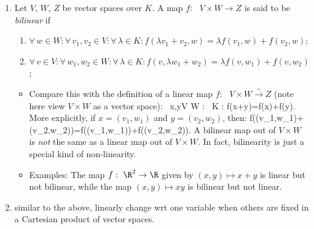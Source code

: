 \documentclass{article}
\newcommand{\cl}{:\text{ }}
\begin{document}
\begin{enumerate}
\begin{itemize}
\end{itemize}
\item {} Let $V$, $W$, $Z$ be vector spaces over $K$. A map $f\cl V\times W \to Z$ is said to be \emph{bilinear} if
\begin{enumerate}
\item $\forall \, w\in W:\forall \, v_1,v_2\in V: \forall \,\lambda \in K : f(\lambda v_1+v_2,w)=\lambda f(v_1,w)+f(v_2,w)$;
\item $\forall \, v\in V:\forall \, w_1,w_2\in W: \forall \,\lambda \in K : f(v,\lambda w_1+w_2)=\lambda f(v,w_1)+f(v,w_2)$;
\end{enumerate}
\begin{itemize}
    \item Compare this with the definition of a linear map $f\cl V\times W \xrightarrow{\sim} Z$ (note here view $V\times W$ as a vector space):
\bse
\forall \, x,y\in V \times W : \forall \, \lambda \in K : f(\lambda x+y)=\lambda f(x)+f(y).
\ese
More explicitly, if $x=(v_1,w_1)$ and $y = (v_2,w_2)$, then:
\bse
f(\lambda (v_1,w_1)+(v_2,w_2))=\lambda f((v_1,w_1))+f((v_2,w_2)).
\ese
A bilinear map out of $V\times W$ is \emph{not} the same as a linear map out of $V\times W$. In fact, bilinearity is just a special kind of non-linearity.
\item Examples: The map $f\cl \R^2\to \R$ given by $(x,y)\mapsto x+y$ is linear but not bilinear, while the map $(x,y)\mapsto xy$ is bilinear but not linear.
\end{itemize}
\item {} similar to the above, linearly change \gls{wrt} one variable when others are fixed in a Cartesian product of vector spaces.


\end{enumerate}
\end{document}
